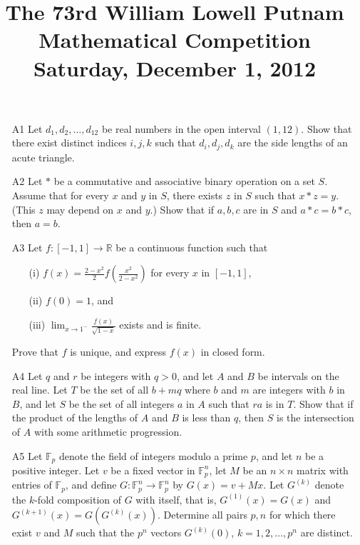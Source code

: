 \documentclass[amssymb,twocolumn,pra,10pt,aps]{revtex4-1}
\begin{document}
\title{The 73rd William Lowell Putnam Mathematical Competition \\
    Saturday, December 1, 2012}
\maketitle

\newcommand{\FF}{\mathbb{F}}
\newcommand{\RR}{\mathbb{R}}

\begin{itemize}

\item[A1] Let $d_1, d_2, \dots, d_{12}$ be real numbers in the open
interval $(1, 12)$. Show that there exist distinct indices $i, j, k$
such that $d_i, d_j, d_k$ are the side lengths of an acute triangle.

\item[A2]
Let $*$ be a commutative and associative binary operation on a set $S$. Assume that for every $x$
and $y$ in $S$, there exists $z$ in $S$ such that $x * z = y$. (This $z$ may depend on $x$ and $y$.)
Show that if $a,b,c$ are in $S$ and $a*c = b*c$, then $a=b$.

\item[A3]
Let $f: [-1, 1] \to \RR$ be a continuous function such that
\begin{itemize}
\item[(i)]
$f(x) = \frac{2-x^2}{2} f \left( \frac{x^2}{2-x^2} \right)$ for every $x$ in $[-1, 1]$,
\item[(ii)]
$f(0) = 1$, and
\item[(iii)]
$\lim_{x \to 1^-} \frac{f(x)}{\sqrt{1-x}}$ exists and is finite.
\end{itemize}
Prove that $f$ is unique, and express $f(x)$ in closed form.

\item[A4]
Let $q$ and $r$ be integers with $q > 0$, and let $A$ and $B$ be intervals on the real line.
Let $T$ be the set of all $b+mq$ where $b$ and $m$ are integers with $b$ in $B$,
and let $S$ be the set of all integers $a$ in $A$ such that $ra$ is in $T$. Show that if the
product of the lengths of $A$ and $B$ is less than $q$, then $S$ is the intersection of $A$
with some arithmetic progression.

\item[A5]
Let $\FF_p$ denote the field of integers modulo a prime $p$, and let $n$ be a positive integer.
Let $v$ be a fixed vector in $\FF_p^n$, let $M$ be an $n \times n$ matrix with entries of $\FF_p$,
and define $G: \FF_p^n \to \FF_p^n$ by $G(x) = v + Mx$. Let $G^{(k)}$ denote the $k$-fold
composition of $G$ with itself, that is, $G^{(1)}(x) = G(x)$ and $G^{(k+1)}(x) = G(G^{(k)}(x))$.
Determine all pairs $p, n$ for which there exist $v$ and $M$ such that the $p^n$ vectors
$G^{(k)}(0)$, $k=1,2,\dots,p^n$ are distinct.


\end{itemize}
\end{document}
